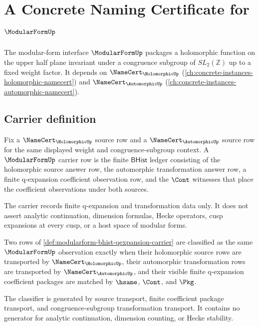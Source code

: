 \chapter{A Concrete Naming Certificate for $\ModularFormUp$}
\label{ch:concrete-instances-modularform-namecert}

The modular-form interface $\ModularFormUp$ packages a holomorphic function on the upper half plane invariant under a congruence subgroup of $SL_2(\mathbb{Z})$ up to a fixed weight factor. It depends on $\NameCert_{\HolomorphicUp}$ (\autoref{ch:concrete-instances-holomorphic-namecert}) and $\NameCert_{\AutomorphicUp}$ (\autoref{ch:concrete-instances-automorphic-namecert}).

\section{Carrier definition}
\label{sec:modularform-carrier}

\begin{definition}
\label{def:modularform-bhist-qexpansion-carrier}
Fix a $\NameCert_{\HolomorphicUp}$ source row and a $\NameCert_{\AutomorphicUp}$ source row for the same displayed weight and congruence-subgroup context. A $\ModularFormUp$ carrier row is the finite $\mathsf{BHist}$ ledger consisting of the holomorphic source answer row, the automorphic transformation answer row, a finite q-expansion coefficient observation row, and the $\Cont$ witnesses that place the coefficient observations under both sources.

The carrier records finite q-expansion and transformation data only. It does not assert analytic continuation, dimension formulas, Hecke operators, cusp expansions at every cusp, or a host space of modular forms.
\end{definition}

\begin{definition}
\label{def:modularform-congruence-classifier}
Two rows of \autoref{def:modularform-bhist-qexpansion-carrier} are classified as the same $\ModularFormUp$ observation exactly when their holomorphic source rows are transported by $\NameCert_{\HolomorphicUp}$, their automorphic transformation rows are transported by $\NameCert_{\AutomorphicUp}$, and their visible finite q-expansion coefficient packages are matched by $\hsame$, $\Cont$, and $\Pkg$.

The classifier is generated by source transport, finite coefficient package transport, and congruence-subgroup transformation transport. It contains no generator for analytic continuation, dimension counting, or Hecke stability.
\end{definition}

